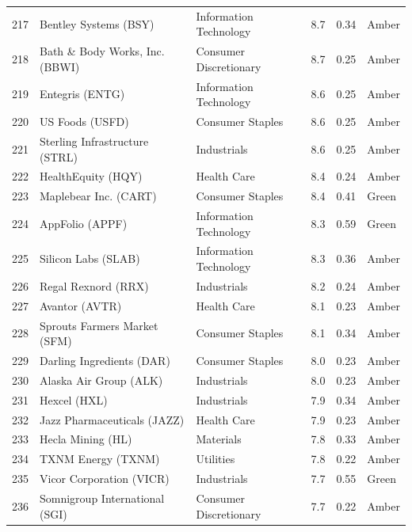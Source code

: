 \documentclass[11pt,a4paper]{article}
\begin{document}
{\begin{longtable}{r p{4.6cm} p{3cm} r r l}
217 & Bentley Systems (BSY) & Information Technology & 8.7 & 0.34 & \cellcolor[HTML]{FFEB9C}Amber \\
218 & Bath \& Body Works, Inc. (BBWI) & Consumer Discretionary & 8.7 & 0.25 & \cellcolor[HTML]{FFEB9C}Amber \\
219 & Entegris (ENTG) & Information Technology & 8.6 & 0.25 & \cellcolor[HTML]{FFEB9C}Amber \\
220 & US Foods (USFD) & Consumer Staples & 8.6 & 0.25 & \cellcolor[HTML]{FFEB9C}Amber \\
221 & Sterling Infrastructure (STRL) & Industrials & 8.6 & 0.25 & \cellcolor[HTML]{FFEB9C}Amber \\
222 & HealthEquity (HQY) & Health Care & 8.4 & 0.24 & \cellcolor[HTML]{FFEB9C}Amber \\
223 & Maplebear Inc. (CART) & Consumer Staples & 8.4 & 0.41 & \cellcolor[HTML]{C6EFCE}Green \\
224 & AppFolio (APPF) & Information Technology & 8.3 & 0.59 & \cellcolor[HTML]{C6EFCE}Green \\
225 & Silicon Labs (SLAB) & Information Technology & 8.3 & 0.36 & \cellcolor[HTML]{FFEB9C}Amber \\
226 & Regal Rexnord (RRX) & Industrials & 8.2 & 0.24 & \cellcolor[HTML]{FFEB9C}Amber \\
227 & Avantor (AVTR) & Health Care & 8.1 & 0.23 & \cellcolor[HTML]{FFEB9C}Amber \\
228 & Sprouts Farmers Market (SFM) & Consumer Staples & 8.1 & 0.34 & \cellcolor[HTML]{FFEB9C}Amber \\
229 & Darling Ingredients (DAR) & Consumer Staples & 8.0 & 0.23 & \cellcolor[HTML]{FFEB9C}Amber \\
230 & Alaska Air Group (ALK) & Industrials & 8.0 & 0.23 & \cellcolor[HTML]{FFEB9C}Amber \\
231 & Hexcel (HXL) & Industrials & 7.9 & 0.34 & \cellcolor[HTML]{FFEB9C}Amber \\
232 & Jazz Pharmaceuticals (JAZZ) & Health Care & 7.9 & 0.23 & \cellcolor[HTML]{FFEB9C}Amber \\
233 & Hecla Mining (HL) & Materials & 7.8 & 0.33 & \cellcolor[HTML]{FFEB9C}Amber \\
234 & TXNM Energy (TXNM) & Utilities & 7.8 & 0.22 & \cellcolor[HTML]{FFEB9C}Amber \\
235 & Vicor Corporation (VICR) & Industrials & 7.7 & 0.55 & \cellcolor[HTML]{C6EFCE}Green \\
236 & Somnigroup International (SGI) & Consumer Discretionary & 7.7 & 0.22 & \cellcolor[HTML]{FFEB9C}Amber \\

\end{longtable}}
\end{document}

